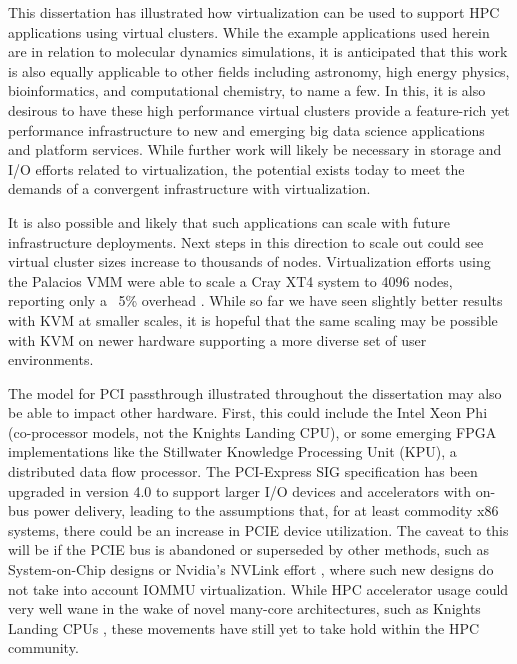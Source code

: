 This dissertation has illustrated how virtualization can be used to support HPC applications using virtual clusters.  While the example applications used herein are in relation to molecular dynamics simulations, it is anticipated that this work is also equally applicable to other fields including astronomy, high energy physics, bioinformatics, and computational chemistry, to name a few. In this, it is also desirous to have these high performance virtual clusters provide a feature-rich yet performance infrastructure to new and emerging big data science applications and platform services.  While further work will likely be necessary in storage and I/O efforts related to virtualization, the potential exists today to meet the demands of a convergent infrastructure with virtualization.   

It is also possible and likely that such applications can scale with future infrastructure deployments.  Next steps in this direction to scale out could see virtual cluster sizes increase to thousands of nodes. Virtualization efforts using the Palacios VMM were able to scale a Cray XT4 system to 4096 nodes, reporting only a ~5\% overhead \cite{lange2011minimal}. While so far we have seen slightly better results with KVM at smaller scales, it is hopeful that the same scaling may be possible with KVM on newer hardware supporting a more diverse set of user environments.  

The model for PCI passthrough illustrated throughout the dissertation may also be able to impact other hardware. First, this could include the Intel Xeon Phi (co-processor models, not the Knights Landing CPU), or some emerging FPGA implementations like the Stillwater Knowledge Processing Unit (KPU), a distributed data flow processor.  The PCI-Express SIG specification has been upgraded in version 4.0 to support larger I/O devices and accelerators with on-bus power delivery, leading to the assumptions that, for at least commodity x86 systems, there could be an increase in PCIE device utilization. The caveat to this will be if the PCIE bus is abandoned or superseded by other methods, such as System-on-Chip designs or Nvidia's NVLink effort \cite{agarwal2015unlocking}, where such new designs do not take into account IOMMU virtualization.  While HPC accelerator usage could very well wane in the wake of novel many-core architectures, such as Knights Landing CPUs \cite{hemmert2016trinity}, these movements have still yet to take hold within the HPC community.  

